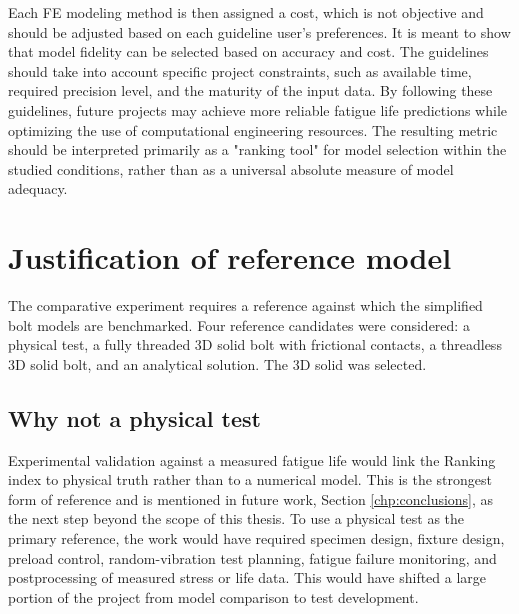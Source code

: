 \documentclass[a4paper,twoside]{bth}
\begin{document}
Each FE modeling method is then assigned a cost, which is not objective and should be adjusted based on each guideline user's preferences. It is meant to show that model fidelity can be selected based on accuracy and cost. The guidelines should take into account specific project constraints, such as available time, required precision level, and the maturity of the input data. By following these guidelines, future projects may achieve more reliable fatigue life predictions while optimizing the use of computational engineering resources. The resulting metric should be interpreted primarily as a "ranking tool" for model selection within the studied conditions, rather than as a universal absolute measure of model adequacy.

\section{Justification of reference model} \label{sec:justification}
The comparative experiment requires a reference against which the simplified bolt models are benchmarked. Four reference candidates were considered: a physical test, a fully threaded 3D solid bolt with frictional contacts, a threadless 3D solid bolt, and an analytical solution. The 3D solid was selected.

\subsection{Why not a physical test}
Experimental validation against a measured fatigue life would link the Ranking index to physical truth rather than to a numerical model. This is the strongest form of reference and is mentioned in future work, Section \ref{chp:conclusions}, as the next step beyond the scope of this thesis. To use a physical test as the primary reference, the work would have required specimen design, fixture design, preload control, random-vibration test planning, fatigue failure monitoring, and postprocessing of measured stress or life data. This would have shifted a large portion of the project from model comparison to test development.
\end{document}
